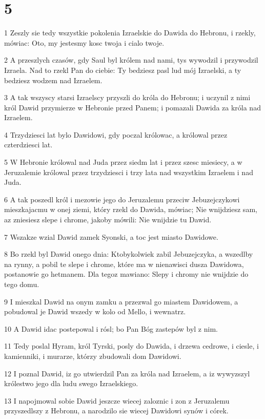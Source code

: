 \chapter{5}

\par 1 Zeszly sie tedy wszystkie pokolenia Izraelskie do Dawida do Hebronu, i rzekly, mówiac: Oto, my jestesmy kosc twoja i cialo twoje.
\par 2 A przeszlych czasów, gdy Saul byl królem nad nami, tys wywodzil i przywodzil Izraela. Nad to rzekl Pan do ciebie: Ty bedziesz pasl lud mój Izraelski, a ty bedziesz wodzem nad Izraelem.
\par 3 A tak wszyscy starsi Izraelscy przyszli do króla do Hebronu; i uczynil z nimi król Dawid przymierze w Hebronie przed Panem; i pomazali Dawida za króla nad Izraelem.
\par 4 Trzydziesci lat bylo Dawidowi, gdy poczal królowac, a królowal przez czterdziesci lat.
\par 5 W Hebronie królowal nad Juda przez siedm lat i przez szesc miesiecy, a w Jeruzalemie królowal przez trzydziesci i trzy lata nad wszystkim Izraelem i nad Juda.
\par 6 A tak poszedl król i mezowie jego do Jeruzalemu przeciw Jebuzejczykowi mieszkajacmu w onej ziemi, który rzekl do Dawida, mówiac; Nie wnijdziesz sam, az zniesiesz slepe i chrome, jakoby mówili: Nie wnijdzie tu Dawid.
\par 7 Wszakze wzial Dawid zamek Syonski, a toc jest miasto Dawidowe.
\par 8 Bo rzekl byl Dawid onego dnia: Ktobykolwiek zabil Jebuzejczyka, a wszedlby na rynny, a pobil te slepe i chrome, które ma w nienawisci dusza Dawidowa, postanowie go hetmanem. Dla tegoz mawiano: Slepy i chromy nie wnijdzie do tego domu.
\par 9 I mieszkal Dawid na onym zamku a przezwal go miastem Dawidowem, a pobudowal je Dawid wszedy w kolo od Mello, i wewnatrz.
\par 10 A Dawid idac postepowal i rósl; bo Pan Bóg zastepów byl z nim.
\par 11 Tedy poslal Hyram, król Tyrski, posly do Dawida, i drzewa cedrowe, i ciesle, i kamienniki, i murarze, którzy zbudowali dom Dawidowi.
\par 12 I poznal Dawid, iz go utwierdzil Pan za króla nad Izraelem, a iz wywyzszyl królestwo jego dla ludu swego Izraelskiego.
\par 13 I napojmowal sobie Dawid jeszcze wiecej zaloznic i zon z Jeruzalemu przyszedlszy z Hebronu, a narodzilo sie wiecej Dawidowi synów i córek.
